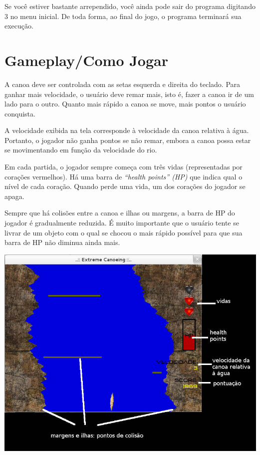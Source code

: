 \documentclass[11pt,a4paper]{article}
\begin{document}
Se você estiver bastante arrependido, você ainda pode sair do programa digitando 3 no menu inicial. De toda forma, ao final do jogo, o programa terminará sua execução.

\section{Gameplay/Como Jogar}
A canoa deve ser controlada com as setas esquerda e direita do teclado. Para ganhar mais velocidade, o usuário deve remar mais, isto é, fazer a canoa ir de um lado para o outro. Quanto mais rápido a canoa se move, mais pontos o usuário conquista.

A velocidade exibida na tela corresponde à velocidade da canoa relativa à água. Portanto, o jogador não ganha pontos se não remar, embora a canoa possa estar se movimentando em função da velocidade do rio.

Em cada partida, o jogador sempre começa com três vidas (representadas por corações vermelhos). Há uma barra de \textit{“health points” (HP)} que indica qual o nível de cada coração. Quando perde uma vida, um dos corações do jogador se apaga. 

Sempre que há colisões entre a canoa e ilhas ou margens, a barra de HP do jogador é gradualmente reduzida. É muito importante que o usuário tente se livrar de um objeto com o qual se chocou o mais rápido possível para que sua barra de HP não diminua ainda mais.

\begin{center}
\includegraphics[scale=0.4]{explicacao.jpg}
\end{center}
\end{document}
